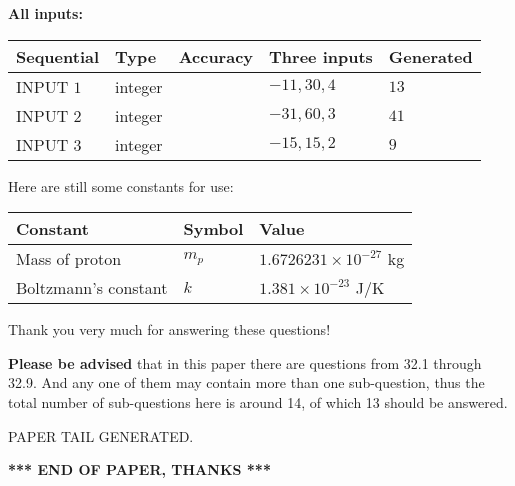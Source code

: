 \documentclass[12pt]{article}
\begin{document}
   
   
   
\noindent\vspace{0.1in}\hspace{-0.08in} {\textbf{\Large{All inputs: }}}
   
   
  
  
\noindent\begin{tabular}{|l|l|l|l|l|}
\hline
 Sequential & Type & Accuracy & Three inputs & Generated \\ 
\hline
 
 
  INPUT $            1 $ & integer &  & $
 -11
 , 
 30
 , 
 4
 $ & $ 13 $ 
 \\  \hline  
 
 
  INPUT $            2 $ & integer &  & $
 -31
 , 
 60
 , 
 3
 $ & $ 41 $ 
 \\  \hline  
 
 
  INPUT $            3 $ & integer &  & $
 -15
 , 
 15
 , 
 2
 $ & $ 9 $ 
 \\  \hline  
 \end{tabular}
   
   
   
   
   
   
 \vspace{0.2in}
Here are still some constants for use:
 
 
\noindent\begin{tabular}{|l|l|l|}
\hline
Constant & Symbol & Value \\
\hline
 
Mass of proton &
$m_p$ &
 $ 1.6726231 \times 10^{-27} $
kg \\
\hline
 
Boltzmann's constant &
$k$ &
 $ 1.381 \times 10^{-23} $
J/K \\
\hline
 
\end{tabular}
 
Thank you very much for answering these questions!
 
{\textbf{\large{Please be advised}}} that in this paper there are questions from
32.1 through
32.9.
And any one of them may contain more than one sub-question, thus the total number
of sub-questions here is around 14, of which
13 should be answered.
 
   
   
\vspace{2.0in} PAPER TAIL GENERATED.
   
   
   
   
\vspace{1.0in} 
{\textbf{\large{ *** END OF PAPER, THANKS *** }}} 
   
\end{document}
